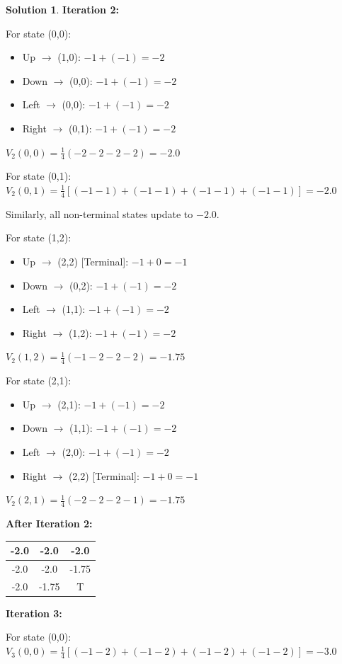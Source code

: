 \documentclass[11pt]{article}
\theoremstyle{definition}
\newtheorem*{solution}{Solution}
\begin{document}
\begin{solution}
\textbf{Iteration 2:}

For state (0,0):
\begin{itemize}
    \item Up $\to$ (1,0): $-1 + (-1) = -2$
    \item Down $\to$ (0,0): $-1 + (-1) = -2$
    \item Left $\to$ (0,0): $-1 + (-1) = -2$
    \item Right $\to$ (0,1): $-1 + (-1) = -2$
\end{itemize}
$V_2(0,0) = \frac{1}{4}(-2 - 2 - 2 - 2) = -2.0$

For state (0,1):
$V_2(0,1) = \frac{1}{4}[(-1 - 1) + (-1 - 1) + (-1 - 1) + (-1 - 1)] = -2.0$

Similarly, all non-terminal states update to $-2.0$.

For state (1,2):
\begin{itemize}
    \item Up $\to$ (2,2) [Terminal]: $-1 + 0 = -1$
    \item Down $\to$ (0,2): $-1 + (-1) = -2$
    \item Left $\to$ (1,1): $-1 + (-1) = -2$
    \item Right $\to$ (1,2): $-1 + (-1) = -2$
\end{itemize}
$V_2(1,2) = \frac{1}{4}(-1 - 2 - 2 - 2) = -1.75$

For state (2,1):
\begin{itemize}
    \item Up $\to$ (2,1): $-1 + (-1) = -2$
    \item Down $\to$ (1,1): $-1 + (-1) = -2$
    \item Left $\to$ (2,0): $-1 + (-1) = -2$
    \item Right $\to$ (2,2) [Terminal]: $-1 + 0 = -1$
\end{itemize}
$V_2(2,1) = \frac{1}{4}(-2 - 2 - 2 - 1) = -1.75$

\begin{center}
\textbf{After Iteration 2:}
\begin{tabular}{|c|c|c|}
\hline
-2.0 & -2.0 & -2.0 \\
\hline
-2.0 & -2.0 & -1.75 \\
\hline
-2.0 & -1.75 & T \\
\hline
\end{tabular}
\end{center}

\textbf{Iteration 3:}

For state (0,0):
$V_3(0,0) = \frac{1}{4}[(-1 - 2) + (-1 - 2) + (-1 - 2) + (-1 - 2)] = -3.0$


\end{solution}
\end{document}

